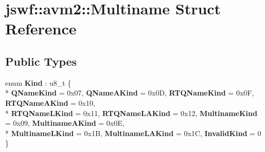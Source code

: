 \hypertarget{structjswf_1_1avm2_1_1_multiname}{\section{jswf\+:\+:avm2\+:\+:Multiname Struct Reference}
\label{structjswf_1_1avm2_1_1_multiname}
}
\subsection*{Public Types}
\begin{DoxyCompactItemize}
\item 
\hypertarget{structjswf_1_1avm2_1_1_multiname_ada7cf4bc0db7a67fd9ac73965ae3d7b9}{enum {\bfseries Kind} \+: u8\+\_\+t \{ \\*
{\bfseries Q\+Name\+Kind} = 0x07, 
{\bfseries Q\+Name\+A\+Kind} = 0x0\+D, 
{\bfseries R\+T\+Q\+Name\+Kind} = 0x0\+F, 
{\bfseries R\+T\+Q\+Name\+A\+Kind} = 0x10, 
\\*
{\bfseries R\+T\+Q\+Name\+L\+Kind} = 0x11, 
{\bfseries R\+T\+Q\+Name\+L\+A\+Kind} = 0x12, 
{\bfseries Multiname\+Kind} = 0x09, 
{\bfseries Multiname\+A\+Kind} = 0x0\+E, 
\\*
{\bfseries Multiname\+L\+Kind} = 0x1\+B, 
{\bfseries Multiname\+L\+A\+Kind} = 0x1\+C, 
{\bfseries Invalid\+Kind} = 0
 \}}\label{structjswf_1_1avm2_1_1_multiname_ada7cf4bc0db7a67fd9ac73965ae3d7b9}

\end{DoxyCompactItemize}
